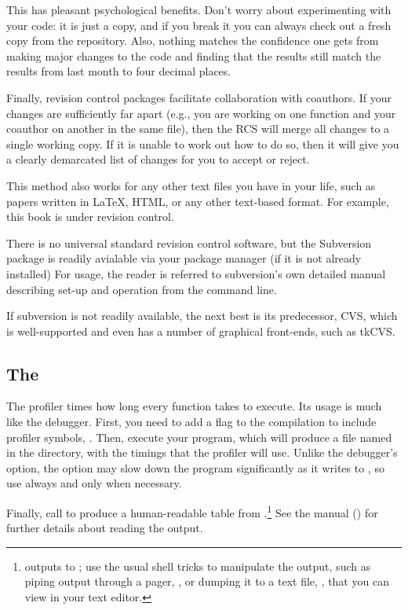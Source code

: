 This has pleasant psychological benefits. Don't worry about experimenting
with your code: it is just a copy, and if you break it you can always check
out a fresh copy from the repository. Also, nothing matches the confidence
one gets from making major changes to the code and finding that the
results still match the results from last month to four decimal places.

Finally, revision control packages facilitate collaboration with
coauthors. If your changes are sufficiently far apart (e.g., you are
working on one function and your coauthor on another in the same file),
then the RCS will merge all changes to a single working copy. If
it is unable to work out how to do so, then it will give you a
clearly demarcated list of changes for you to accept or reject.

This method also works for any other text files you have in your
life, such as papers written in \LaTeX, HTML, or any other text-based
format. For example, this book is under revision control.

There is no universal standard revision control software, but the
Subversion package is readily avialable via your package manager (if it is
not already installed) For usage, the reader is referred to subversion's
own detailed manual describing set-up and operation from the command line.

If subversion is not readily available, the next best is its predecessor,
CVS, which is well-supported and even has a number of graphical
front-ends, such as tkCVS.  

\subsection{The } The profiler times how long every function
takes to execute. Its usage is much like the debugger. First, you need
to add a flag to the compilation to include profiler symbols,
. Then, execute your program, which will produce a file named
 in the directory, with the timings that the profiler
will use. Unlike the debugger's  option, the 
option may slow down the program significantly as it writes to
, so use  always and  only
when necessary.

Finally, call  to produce a
human-readable table from .\footnote{
outputs to ; use the usual shell tricks to manipulate
the output, such as piping output through a pager, , or dumping it to a text file, , that you can view in your text editor.}
See the manual () for further details about reading
the output.

